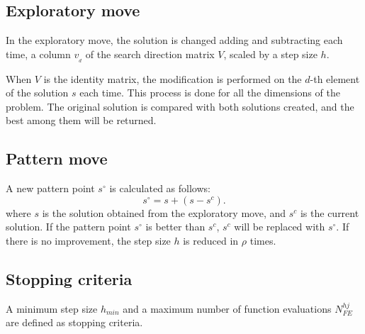 \subsection{Exploratory move}
In the exploratory move, the solution is changed adding and subtracting each time, a column $v_{_d}$ of the search direction matrix $V$, scaled by a step size $h$.

When $V$ is the identity matrix, the modification is performed on the $d$-th element of the solution $s$ each time. This process is done for all the dimensions of the problem. The original solution is compared with both solutions created, and the best among them will be returned.

\subsection{Pattern move}

A new pattern point $s^{\circ}$ is calculated as follows:
%
\begin{equation}
    s^{\circ} = s + \left(s - s^c \right).
\end{equation}
%
where $s$ is the solution obtained from the exploratory move, and $s^c$ is the current solution. If the pattern point $s^{\circ}$ is better than $s^c$, $s^c$ will be replaced with $s^{\circ}$. If there is no improvement, the step size $h$ is reduced in $\rho$ times.

\subsection{Stopping criteria}

A minimum step size $h_{min}$ and a maximum number of function evaluations $N_{FE}^{hj}$ are defined as stopping criteria.